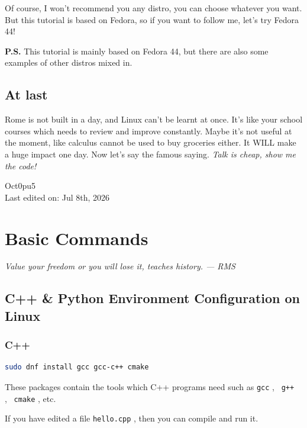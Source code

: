 \documentclass[lang=en,color=blue,12pt]{elegantbook}
\let\oldtexttt\texttt
\renewcommand{\texttt}[1]{%
  \begingroup
  \setlength{\fboxsep}{1pt}%
  \colorbox{gray!10}{\oldtexttt{#1}}%
  \endgroup
}
\begin{document}
Of course, I won't recommend you any distro, you can choose whatever
you want. But this tutorial is based on Fedora, so if you want to follow me,
let's try Fedora 44!

\textbf{P.S.} This tutorial is mainly based on Fedora 44, but there are
also some examples of other distros mixed in.

\section*{\textbf{At last}}

Rome is not built in a day, and Linux can't be learnt at
once. It's like your school courses which needs to
review and improve constantly. Maybe it's not useful at
the moment, like calculus cannot be used to buy groceries either. It
WILL make a huge impact one day. Now let's say the
famous saying. \emph{Talk is cheap, show me the code!}

\begin{flushright}
Oct0pu5\\
Last edited on: Jul 8th, 2026
\end{flushright}

\chapter{Basic Commands}

\begin{flushright}
\textit{Value your freedom or you will lose it, teaches history. --- RMS}
\end{flushright}
\section{\textbf{C++ \& Python Environment Configuration on Linux}}

\subsection{\textbf{C++}}

\begin{lstlisting}[language=bash]
sudo dnf install gcc gcc-c++ cmake
\end{lstlisting}

These packages contain the tools which C++ programs need such
as \texttt{gcc},\ \texttt{g++},\ \texttt{cmake}, etc.

If you have edited a file \texttt{hello.cpp}, then you can compile and
run it.
\end{document}

